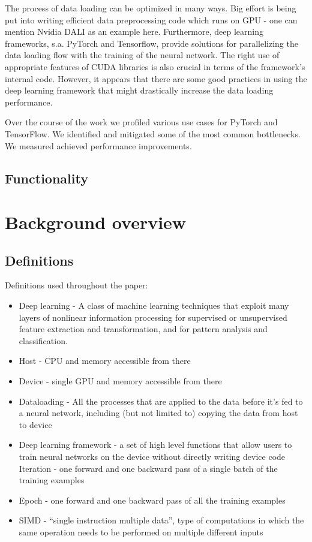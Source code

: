 \documentclass[licencjacka,en]{pracamgr}
\begin{document}
The process of data loading can be optimized in many ways. Big effort is being put into writing efficient data preprocessing code which runs on GPU - one can mention Nvidia DALI as an example here. Furthermore, deep learning frameworks, s.a. PyTorch and Tensorflow, provide solutions for parallelizing the data loading flow with the training of the neural network. The right use of appropriate features of CUDA libraries is also crucial in terms of the framework’s internal code. However, it appears that there are some good practices in using the deep learning framework that might drastically increase the data loading performance.

Over the course of the work we profiled various use cases for PyTorch and TensorFlow. We identified and mitigated some of the most common bottlenecks. We measured achieved performance improvements.

\section*{Functionality}


\chapter{Background overview}

\section*{Definitions}
Definitions used throughout the paper:
\begin{itemize}
\item Deep learning - A  class  of  machine  learning  techniques  that exploit  many  layers  of  nonlinear  information  processing  for supervised  or  unsupervised  feature  extraction  and  transformation, and for pattern analysis and classification.
\item Host - CPU and memory accessible from there
\item Device - single GPU and memory accessible from there
\item Dataloading - All the processes that are applied to the data before it’s fed to a neural network, including (but not limited to) copying the data from host to device
\item Deep learning framework - a set of high level functions that allow users to train neural networks on the device without directly writing device code
Iteration - one forward and one backward pass of a single batch of the training examples
\item Epoch - one forward and one backward pass of all the training examples
\item SIMD - “single instruction multiple data”, type of computations in which the same operation needs to be performed on multiple different inputs
\end{itemize}
\end{document}

